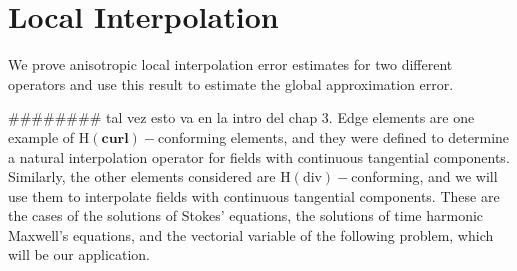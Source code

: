 \chapter{Local Interpolation}
We prove anisotropic local interpolation error estimates for two different operators
and use this result to estimate the global approximation error.

{\color{Orange}\#\#\#\#\#\#\#\# tal vez esto va en la intro del chap 3.
Edge elements are one example of $\textrm{H}(\textbf{curl})-$conforming elements, and they were
defined to determine a natural interpolation operator for fields with continuous tangential components.
Similarly, the other elements considered are $\textrm{H}(\text{div})-$conforming, and we will use them 
to interpolate fields with continuous tangential components. These are the cases of the
solutions of Stokes' equations, the solutions of time harmonic Maxwell's equations, and the vectorial
variable of the following problem, which will be our application.
}	




